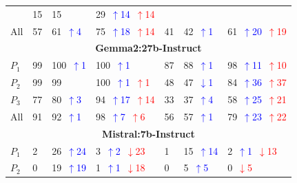 \begin{table}
\begin{tabularx}{\textwidth}{l X X X X X X}
& 15 
& 15
& 29~\textcolor{blue}{\scriptsize$\uparrow$14}~\textcolor{red}{\scriptsize$\uparrow$14} \\
All 
& 57 
& 61~\textcolor{blue}{\scriptsize$\uparrow$4}   
& 75~\textcolor{blue}{\scriptsize$\uparrow$18}~\textcolor{red}{\scriptsize$\uparrow$14}
& 41 
& 42~\textcolor{blue}{\scriptsize$\uparrow$1}   
& 61~\textcolor{blue}{\scriptsize$\uparrow$20}~\textcolor{red}{\scriptsize$\uparrow$19} \\
\midrule
\multicolumn{7}{c}{\small\textbf{Gemma2:27b-Instruct}} \\
\midrule
$P_1$ 
& 99 
& 100~\textcolor{blue}{\scriptsize$\uparrow$1}   
& 100~\textcolor{blue}{\scriptsize$\uparrow$1}
& 87 
& 88~\textcolor{blue}{\scriptsize$\uparrow$1}   
& 98~\textcolor{blue}{\scriptsize$\uparrow$11}~\textcolor{red}{\scriptsize$\uparrow$10} \\
$P_2$ 
& 99 
& 99 
& 100~\textcolor{blue}{\scriptsize$\uparrow$1}~\textcolor{red}{\scriptsize$\uparrow$1}
& 48 
& 47~\textcolor{blue}{\scriptsize$\downarrow$1}
& 84~\textcolor{blue}{\scriptsize$\uparrow$36}~\textcolor{red}{\scriptsize$\uparrow$37} \\
$P_3$ 
& 77 
& 80~\textcolor{blue}{\scriptsize$\uparrow$3}   
& 94~\textcolor{blue}{\scriptsize$\uparrow$17}~\textcolor{red}{\scriptsize$\uparrow$14}
& 33 
& 37~\textcolor{blue}{\scriptsize$\uparrow$4}   
& 58~\textcolor{blue}{\scriptsize$\uparrow$25}~\textcolor{red}{\scriptsize$\uparrow$21} \\
All 
& 91 
& 92~\textcolor{blue}{\scriptsize$\uparrow$1}   
& 98~\textcolor{blue}{\scriptsize$\uparrow$7}~\textcolor{red}{\scriptsize$\uparrow$6}
& 56 
& 57~\textcolor{blue}{\scriptsize$\uparrow$1}   
& 79~\textcolor{blue}{\scriptsize$\uparrow$23}~\textcolor{red}{\scriptsize$\uparrow$22} \\
\midrule
\multicolumn{7}{c}{\small\textbf{Mistral:7b-Instruct}} \\
\midrule
$P_1$ 
& 2 
& 26~\textcolor{blue}{\scriptsize$\uparrow$24}   
& 3~\textcolor{blue}{\scriptsize$\uparrow$2}~\textcolor{red}{\scriptsize$\downarrow$23}
& 1 
& 15~\textcolor{blue}{\scriptsize$\uparrow$14}   
& 2~\textcolor{blue}{\scriptsize$\uparrow$1}~\textcolor{red}{\scriptsize$\downarrow$13} \\
$P_2$ 
& 0 
& 19~\textcolor{blue}{\scriptsize$\uparrow$19}    
& 1~\textcolor{blue}{\scriptsize$\uparrow$1}~\textcolor{red}{\scriptsize$\downarrow$18}
& 0 
& 5~\textcolor{blue}{\scriptsize$\uparrow$5}    
& 0~\textcolor{red}{\scriptsize$\downarrow$5} \\

\end{tabularx}
\end{table}

